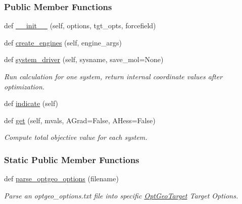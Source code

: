 \subsubsection*{Public Member Functions}
\begin{DoxyCompactItemize}
\item 
def \hyperlink{classsrc_1_1opt__geo__target_1_1OptGeoTarget_a6ced711f4eee45542af1fdb9df23dee6}{\+\_\+\+\_\+init\+\_\+\+\_\+} (self, options, tgt\+\_\+opts, forcefield)
\item 
def \hyperlink{classsrc_1_1opt__geo__target_1_1OptGeoTarget_a3bd3235bb0ebf7d61e30e4f9d4c21e87}{create\+\_\+engines} (self, engine\+\_\+args)
\item 
def \hyperlink{classsrc_1_1opt__geo__target_1_1OptGeoTarget_a9ce6a2e6b4a9e7ee4e72de8287ddccba}{system\+\_\+driver} (self, sysname, save\+\_\+mol=None)
\begin{DoxyCompactList}\small\item\em Run calculation for one system, return internal coordinate values after optimization. \end{DoxyCompactList}\item 
def \hyperlink{classsrc_1_1opt__geo__target_1_1OptGeoTarget_ae16187c64e7ecd1e7adae8a3387a1c49}{indicate} (self)
\item 
def \hyperlink{classsrc_1_1opt__geo__target_1_1OptGeoTarget_a4aeb19ba173ff0067589a8edba18a6a2}{get} (self, mvals, A\+Grad=False, A\+Hess=False)
\begin{DoxyCompactList}\small\item\em Compute total objective value for each system. \end{DoxyCompactList}\end{DoxyCompactItemize}
\subsubsection*{Static Public Member Functions}
\begin{DoxyCompactItemize}
\item 
def \hyperlink{classsrc_1_1opt__geo__target_1_1OptGeoTarget_ad20376e926556e19798b72be33516ba9}{parse\+\_\+optgeo\+\_\+options} (filename)
\begin{DoxyCompactList}\small\item\em Parse an optgeo\+\_\+options.\+txt file into specific \hyperlink{classsrc_1_1opt__geo__target_1_1OptGeoTarget}{Opt\+Geo\+Target} Target Options. \end{DoxyCompactList}\end{DoxyCompactItemize}

